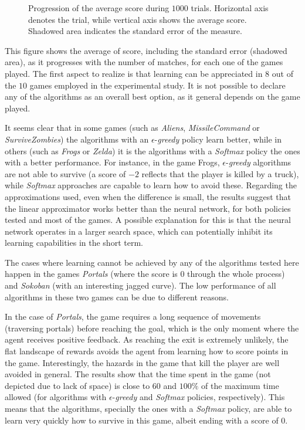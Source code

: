 \documentclass[conference]{IEEEtran}
\begin{document}
\begin{figure}[ht]
\begin{center}
	\vspace{-1mm}
	\caption{Progression of the average score during $1000$ trials. Horizontal axis denotes the trial, while vertical axis shows the average score. Shadowed area indicates the standard error of the measure.}
	\label{fig:results}
	\end{center}
\end{figure}

This figure shows the average of score, including the standard error (shadowed area), as it progresses with the number of matches, for each one of the games played. The first aspect to realize is that learning can be appreciated in $8$ out of the $10$ games employed in the experimental study. It is not possible to declare any of the algorithms as an overall best option, as it general depends on the game played. 

It seems clear that in some games (such as \textit{Aliens}, \textit{MissileCommand} or \textit{SurviveZombies}) the algorithms with an $\epsilon$-\textit{greedy} policy learn better, while in others (such as \textit{Frogs} or \textit{Zelda}) it is the algorithms with a \textit{Softmax} policy the ones with a better performance. For instance, in the game Frogs, $\epsilon$-\textit{greedy} algorithms are not able to survive (a score of $-2$ reflects that the player is killed by a truck), while \textit{Softmax}  approaches are capable to learn how to avoid these. Regarding the approximations used, even when the difference is small, the results suggest that the linear approximator works better than the neural network, for both policies tested and most of the games. A possible explanation for this is that the neural network operates in a larger search space, which can potentially inhibit its learning capabilities in the short term.

The cases where learning cannot be achieved by any of the algorithms tested here happen in the games \textit{Portals} (where the score is $0$ through the whole process) and \textit{Sokoban} (with an interesting jagged curve). The low performance of all algorithms in these two games can be due to different reasons.

In the case of \textit{Portals}, the game requires a long sequence of movements (traversing portals) before reaching the goal, which is the only moment where the agent receives positive feedback. As reaching the exit is extremely unlikely, the flat landscape of rewards avoids the agent from learning how to score points in the game. Interestingly, the hazards in the game that kill the player are well avoided in general. The results show that the time spent in the game (not depicted due to lack of space) is close to $60$ and $100\%$ of the maximum time allowed (for algorithms with $\epsilon$-\textit{greedy} and \textit{Softmax} policies, respectively). This means that the algorithms, specially the ones with a \textit{Softmax} policy, are able to learn very quickly how to survive in this game, albeit ending with a score of $0$.
\end{document}
